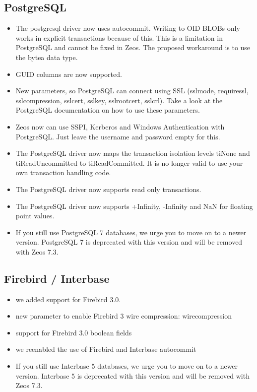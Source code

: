 \documentclass[a4paper,12pt,oneside]{article}
\begin{document}
\subsection{PostgreSQL}
\begin{itemize}
\item The postgresql driver now uses autocommit. Writing to OID BLOBs only works in explicit transactions because of this. 
This is a limitation in PostgreSQL and cannot be fixed in Zeos. The proposed workaround is to use the bytea data type.
\item GUID columns are now supported.
\item 
  New parameters, so PostgreSQL can connect using SSL (sslmode, requiressl, sslcompression, sslcert, sslkey, sslrootcert, sslcrl). 
	Take a look at the PostgreSQL documentation on how to use these parameters.
\item
  Zeos now can use SSPI, Kerberos and Windows Authentication with PostgreSQL.
	Just leave the username and password empty for this.
\item
  The PostgreSQL driver now maps the transaction isolation levels tiNone and tiReadUncommitted to tiReadCommitted.
	It is no longer valid to use your own transaction handling code.
\item
  The PostgreSQL driver now supports read only transactions.
\item
  The PostgreSQL driver now supports +Infinity, -Infinity and NaN for floating point values.
\item
  If you still use PostgreSQL 7 databases, we urge you to move on to a newer version.
	PostgreSQL 7 is deprecated with this version and will be removed with Zeos 7.3.
\end{itemize}

\subsection{Firebird / Interbase}
\begin{itemize}
\item we added support for Firebird 3.0.
\item new parameter to enable Firebird 3 wire compression: wirecompression
\item support for Firebird 3.0 boolean fields
\item we reenabled the use of Firebird and Interbase autocommit
\item 
  If you still use Interbase 5 databases, we urge you to move on to a newer version.
	Interbase 5 is deprecated with this version and will be removed with Zeos 7.3.
\end{itemize}
\end{document}
